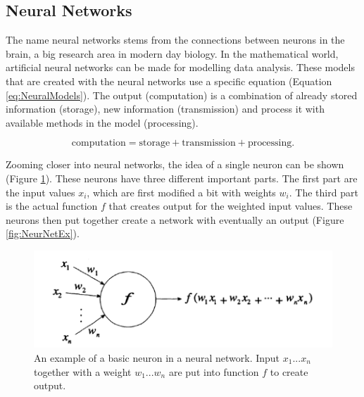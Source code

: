 \documentclass[10pt,a4paper]{report}
\begin{document}
	\clearpage
	
	\subsection{Neural Networks}
	
	The name neural networks stems from the connections between neurons in the 
	brain, a big research area in modern day biology. In the mathematical 
	world, artificial neural networks can be made for modelling data analysis. 
	These models that are created with the neural networks use a specific 
	equation (Equation \ref{eq:NeuralModels}). The output (computation) is a 
	combination of already stored information (storage), new information 
	(transmission) and process it with available methods in the model 
	(processing). \cite{rojas2013neural}
	
	\begin{equation}
	\label{eq:NeuralModels}
	\text{computation} = \text{storage} + \text{transmission} + 
	\text{processing}.
	\end{equation}
	
	Zooming closer into neural networks, the idea of a single neuron can be 
	shown (Figure \ref{fig:NeurEx}). These neurons have three different 
	important parts. The first part are the input values $x_i$, which are first 
	modified a bit with weights $w_i$. The third part is the actual function 
	$f$ that creates output for the weighted input values. These neurons  then 
	put together create a network with eventually an output (Figure 
	\ref{fig:NeurNetEx}). \cite{rojas2013neural}
	
	\begin{figure}[h!]
		\includegraphics{NeuronExample.PNG}
		\caption{An example of a basic neuron in a neural network. Input 
			$x_1...x_n$ together with a weight $w_1...w_n$ are put into function 
			$f$ to create output.  \cite{rojas2013neural}}
		\label{fig:NeurEx}
	\end{figure}
	
\end{document}
